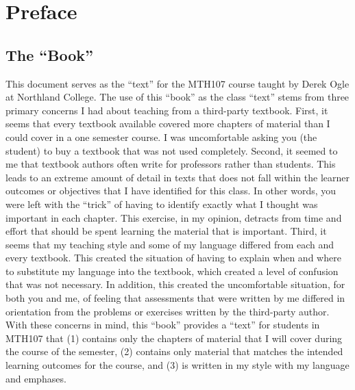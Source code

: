 \cleardoublepage                          %
\setlength{\cftbeforepartskip}{0.4em}     %
\vspace{-120pt}
\chapter*{Preface}                        %
\vspace{-80pt}
\section*{The ``Book''}
This document serves as the ``text'' for the MTH107 course taught by Derek Ogle at Northland College.  The use of this ``book'' as the class ``text'' stems from three primary concerns I had about teaching from a third-party textbook.  First, it seems that every textbook available covered more chapters of material than I could cover in a one semester course.  I was uncomfortable asking you (the student) to buy a textbook that was not used completely.  Second, it seemed to me that textbook authors often write for professors rather than students.  This leads to an extreme amount of detail in texts that does not fall within the learner outcomes or objectives that I have identified for this class.  In other words, you were left with the ``trick'' of having to identify exactly what I thought was important in each chapter.  This exercise, in my opinion, detracts from time and effort that should be spent learning the material that is important.  Third, it seems that my teaching style and some of my language differed from each and every textbook.  This created the situation of having to explain when and where to substitute my language into the textbook, which created a level of confusion that was not necessary.  In addition, this created the uncomfortable situation, for both you and me, of feeling that assessments that were written by me differed in orientation from the problems or exercises written by the third-party author.  With these concerns in mind, this ``book'' provides a ``text'' for students in MTH107 that (1) contains only the chapters of material that I will cover during the course of the semester, (2) contains only material that matches the intended learning outcomes for the course, and (3) is written in my style with my language and emphases.


